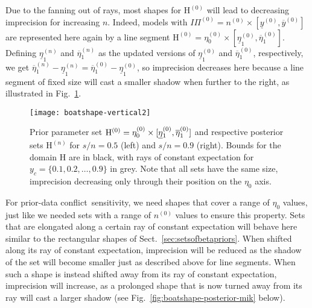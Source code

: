 \documentclass[runningheads,a4paper]{llncs}
\def\pdc{prior-data conflict}
\newcommand{\uz}{^{(0)}} %
\newcommand{\un}{^{(n)}} %
\newcommand{\ul}[1]{\underline{#1}}
\newcommand{\ol}[1]{\overline{#1}}
\def\yzl{\ul{y}\uz}
\def\yzu{\ol{y}\uz}
\def\nz{n\uz}
\def\PZ{I\!\!\Pi\uz}
\def\Eta{\mathrm{H}}
\def\EZ{\mathrm{H}\uz}
\def\EN{\mathrm{H}\un}
\def\ezz{\eta_0\uz}
\def\ezn{\eta_0\un}
\def\eozl{\ul{\eta}_1\uz}
\def\eozu{\ol{\eta}_1\uz}
\def\eonl{\ul{\eta}_1\un}
\def\eonu{\ol{\eta}_1\un}
\begin{document}
Due to the fanning out of rays, most shapes for $\EZ$ will lead to decreasing imprecision for increasing $n$.
Indeed, models with $\PZ = \nz \times [\yzl, \yzu]$
are represented here again by a line segment $\EZ = \ezz \times [\eozl,\eozu]$.
Defining $\eonl$ and $\eonu$ as the updated versions of $\eozl$ and $\eozu$, respectively,
we get $\eonu-\eonl = \eozu-\eozl$,
so imprecision decreases here because a line segment of fixed size
will cast a smaller shadow when further to the right,
as illustrated in Fig.~\ref{fig:boatshape-vertical}.
\begin{figure}  %
\centering
\texttt{[image: boatshape-vertical2]}%
\caption[Line segment parameter set $\EZ$ %
and respective posterior sets for $s/n=0.5$ and $s/n=0.9$.]%
{Prior parameter set $\EZ = \ezz \times [\text{\underline{$\eta$}${}_1\uz$},\eozu]$
and respective posterior sets $\EN$ for $s/n=0.5$ (left) and $s/n=0.9$ (right).
Bounds for the domain $\Eta$ are in black, with rays of constant expectation for $y_c = \{0.1,0.2,\ldots,0.9\}$ in grey. 
Note that all sets have the same size, imprecision decreasing only through their position on the $\eta_0$ axis.}
\label{fig:boatshape-vertical}
\end{figure}

For \pdc\ sensitivity, we need shapes that cover a range of $\eta_0$ values,
just like we needed sets with a range of $\nz$ values to ensure this property.
Sets that are elongated along a certain ray of constant expectation
will behave here similar to the rectangular shapes of Sect.~\ref{sec:setsofbetapriors}.
When shifted along its ray of constant expectation,
imprecision will be reduced as the shadow of the set will become smaller just as described above for line segments.
When such a shape is instead shifted away from its ray of constant expectation,
imprecision will increase, as a prolonged shape that is now turned away from its ray 
will cast a larger shadow (see Fig.~\ref{fig:boatshape-posterior-mik} below).%
\end{document}

